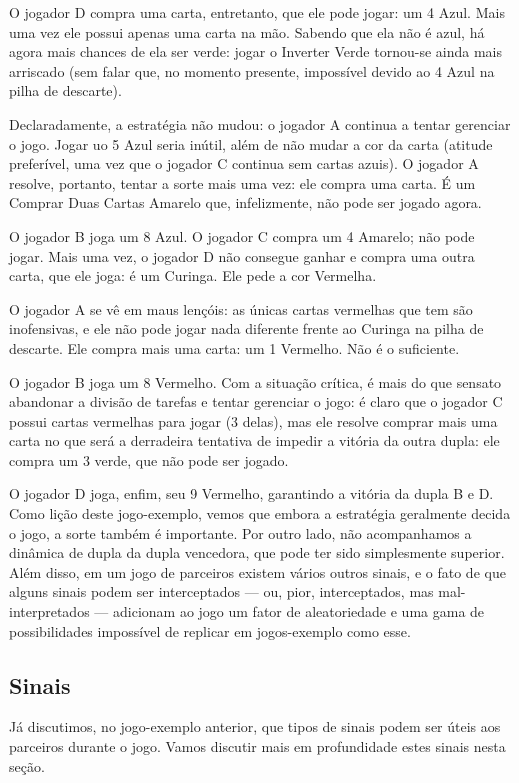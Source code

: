 O jogador D compra uma carta, entretanto, que ele pode jogar: um 4 Azul. Mais uma vez ele possui apenas uma carta na mão. Sabendo que ela não é azul, há agora mais chances de ela ser verde: jogar o Inverter Verde tornou-se ainda mais arriscado (sem falar que, no momento presente, impossível devido ao 4 Azul na pilha de descarte).

Declaradamente, a estratégia não mudou: o jogador A continua a tentar gerenciar o jogo. Jogar uo 5 Azul seria inútil, além de não mudar a cor da carta (atitude preferível, uma vez que o jogador C continua sem cartas azuis). O jogador A resolve, portanto, tentar a sorte mais uma vez: ele compra uma carta. É um Comprar Duas Cartas Amarelo que, infelizmente, não pode ser jogado agora.

O jogador B joga um 8 Azul. O jogador C compra um 4 Amarelo; não pode jogar. Mais uma vez, o jogador D não consegue ganhar e compra uma outra carta, que ele joga: é um Curinga. Ele pede a cor Vermelha.

O jogador A se vê em maus lençóis: as únicas cartas vermelhas que tem são inofensivas, e ele não pode jogar nada diferente frente ao Curinga na pilha de descarte. Ele compra mais uma carta: um 1 Vermelho. Não é o suficiente.

O jogador B joga um 8 Vermelho. Com a situação crítica, é mais do que sensato abandonar a divisão de tarefas e tentar gerenciar o jogo: é claro que o jogador C possui cartas vermelhas para jogar (3 delas), mas ele resolve comprar mais uma carta no que será a derradeira tentativa de impedir a vitória da outra dupla: ele compra um 3 verde, que não pode ser jogado.

O jogador D joga, enfim, seu 9 Vermelho, garantindo a vitória da dupla B e D. Como lição deste jogo-exemplo, vemos que embora a estratégia geralmente decida o jogo, a sorte também é importante. Por outro lado, não acompanhamos a dinâmica de dupla da dupla vencedora, que pode ter sido simplesmente superior. Além disso, em um jogo de parceiros existem vários outros sinais, e o fato de que alguns sinais podem ser interceptados --- ou, pior, interceptados, mas mal-interpretados --- adicionam ao jogo um fator de aleatoriedade e uma gama de possibilidades impossível de replicar em jogos-exemplo como esse.

\subsection{Sinais}

Já discutimos, no jogo-exemplo anterior, que tipos de sinais podem ser úteis aos parceiros durante o jogo. Vamos discutir mais em profundidade estes sinais nesta seção.

